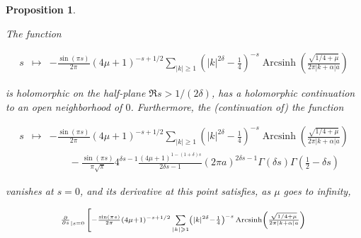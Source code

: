 \documentclass{jams-l}
\newtheorem{proposition}[theorem]{Proposition}
\theoremstyle{definition}
\theoremstyle{remark}
\numberwithin{equation}{section}
\DeclareMathOperator{\arcsinh}{Arcsinh}
\begin{document}
            \begin{proposition}
            \label{PropA8}
            
                The function
                
                \[ \begin{array}{lll}
                        s & \longmapsto & - \frac{\sin \left( \pi s \right)}{2 \pi} \left( 4 \mu + 1 \right)^{-s+1/2} \sum\limits_{\left \vert k \right \vert \geqslant 1} \left( \left \vert k \right \vert^{2 \delta}  - \frac{1}{4} \right)^{-s} \arcsinh \left( \frac{\sqrt{1/4 + \mu}}{2 \pi \left \vert k + \alpha \right \vert a} \right)
                    \end{array} \]
                
                \noindent is holomorphic on the half-plane $\Re s > 1/\left( 2 \delta \right)$, has a holomorphic continuation to an open neighborhood of $0$. Furthermore, the (continuation of) the function 
                
                \[ \begin{array}{lll}
                        \scriptstyle s & \scriptstyle \longmapsto & \scriptstyle - \frac{\sin \left( \pi s \right)}{2 \pi} \left( 4 \mu + 1 \right)^{-s+1/2} \sum\limits_{\left \vert k \right \vert \geqslant 1} \left( \left \vert k \right \vert^{2 \delta}  - \frac{1}{4} \right)^{-s} \arcsinh \left( \frac{\sqrt{1/4 + \mu}}{2 \pi \left \vert k + \alpha \right \vert a} \right) \\[1em]
                        
                        && \qquad \scriptstyle - \frac{\sin \left( \pi s \right)}{\pi \sqrt{\pi}} 4^{\delta s - 1} \frac{\left( 4 \mu + 1 \right)^{1 - \left( 1 + \delta \right) s}}{2 \delta s - 1} \left( 2 \pi a \right)^{2 \delta s - 1} \Gamma \left( \delta s \right) \Gamma \left( \frac{1}{2} - \delta s \right)
                    \end{array} \]
                
                \noindent vanishes at $s=0$, and its derivative at this point satisfies, as $\mu$ goes to infinity,
                
                \[ \begin{array}{lll}
                        \multicolumn{3}{l}{\scriptstyle \frac{\partial}{\partial s}_{\left \vert s = 0 \right.} \left[ - \frac{\sin \left( \pi s \right)}{2 \pi} \left( 4 \mu + 1 \right)^{-s+1/2} \sum\limits_{\left \vert k \right \vert \geqslant 1} \left( \left \vert k \right \vert^{2 \delta}  - \frac{1}{4} \right)^{-s} \arcsinh \left( \frac{\sqrt{1/4 + \mu}}{2 \pi \left \vert k + \alpha \right \vert a} \right) \right.} \\[1em]
                        

\end{array}\]
\end{proposition}
\end{document}
